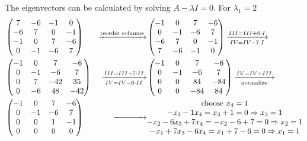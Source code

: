 \documentclass[a4paper,german,12pt,smallheadings]{scrartcl}
\begin{document}
\begin{enumerate}[a)]
    The eigenvectors can be calculated by solving $A - \lambda I = 0$. For $\lambda_1 = 2$
    \begin{alignat*}{2}
      &\begin{pmatrix}
        7 & -6 & -1 & 0 \\
        -6 & 7 & 0 & -1 \\
        -1 & 0 & 7 & -6 \\
        0 & -1 & -6 & 7 \\
      \end{pmatrix}
      &\xrightarrow{\text{reorder columns}}
      &\begin{pmatrix}
        -1 & 0 & 7 & -6 \\
        0 & -1 & -6 & 7 \\
        -6 & 7 & 0 & -1 \\
        7 & -6 & -1 & 0 \\
      \end{pmatrix}
      \xrightarrow[IV = IV - 7 \cdot I]{III = III + 6 \cdot I}\\
      &\begin{pmatrix}
        -1 & 0 & 7 & -6 \\
        0 & -1 & -6 & 7 \\
        0  & 7 & -42 & 35 \\
        0 & -6 & 48 & -42 \\
      \end{pmatrix}
      &\xrightarrow[IV=IV-6\cdot II]{III=III+7 \cdot II}
      &\begin{pmatrix}
        -1 & 0 & 7 & -6 \\
        0 & -1 & -6 & 7 \\
        0 & 0 & 84 & -84 \\
        0  & 0 & -84 & 84 \\
      \end{pmatrix}
      \xrightarrow[\text{normalize}]{IV = IV + III} \\
      &\begin{pmatrix}
        -1 & 0 & 7 & -6 \\
        0 & -1 & -6 & 7 \\
        0 & 0 & 1 & -1 \\
        0  & 0 & 0 & 0 \\
      \end{pmatrix}
      &\xrightarrow{\hspace{1.3cm}}
      &\begin{matrix}
        \text{choose } x_4 = 1 \\
        -x_3 - 1x_4 = x_3 + 1 = 0 \Rightarrow x_3 = 1 \\
        -x_2 - 6x_3 + 7x_4 = -x_2 -6 +7 = 0 \Rightarrow x_2 = 1 \\
        -x_1 + 7x_3 - 6x_4 = x_1 +7 -6 = 0 \Rightarrow x_1 = 1
      \end{matrix}
    \end{alignat*}


\end{enumerate}
\end{document}
